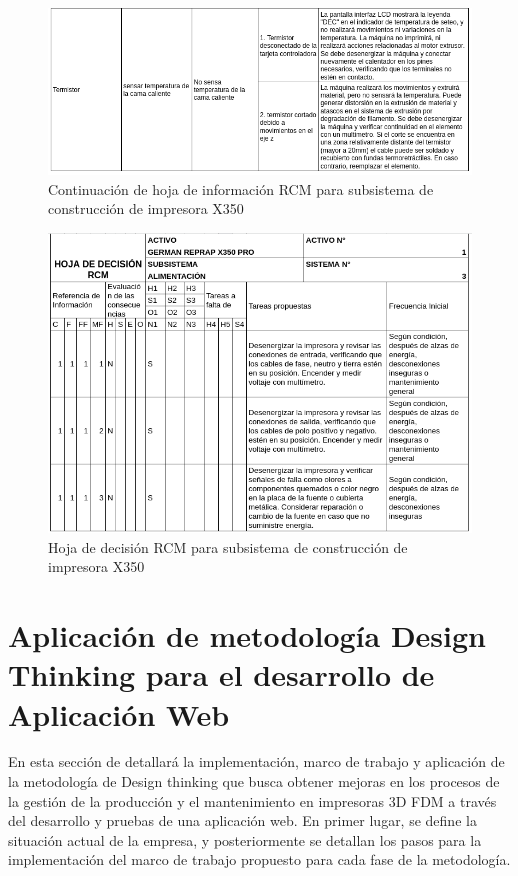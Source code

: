 \begin{figure}[H]
\centering
\includegraphics[scale=0.7]{images/amef52.png}
\caption{Continuación de hoja de información RCM para subsistema de construcción de impresora X350}
\end{figure}


\begin{figure}[H]
\centering
\includegraphics[scale=0.7]{images/decision41.png}
\caption{Hoja de decisión RCM para subsistema de construcción de impresora X350}
\end{figure}



\section{Aplicación de metodología Design Thinking para el desarrollo de Aplicación Web}

En esta sección de detallará la implementación, marco de trabajo y aplicación de la metodología de Design thinking que busca obtener mejoras en los procesos de la gestión de la producción y el mantenimiento en impresoras 3D FDM a través del desarrollo y pruebas de una aplicación web. En primer lugar, se define la situación actual de la empresa, y posteriormente se detallan los pasos para la implementación del marco de trabajo propuesto para cada fase de la metodología.

